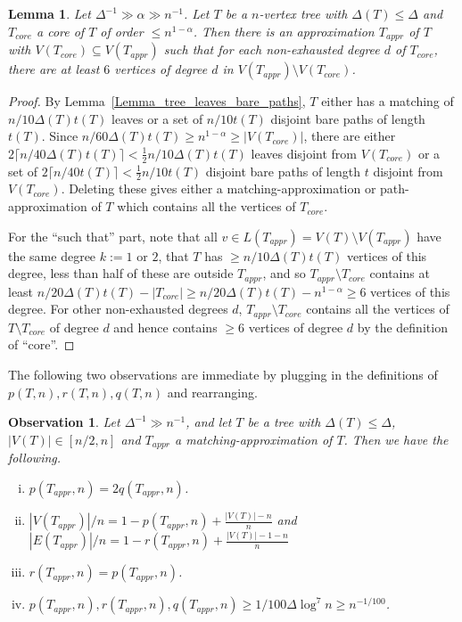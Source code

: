 \documentclass[a4paper,11pt,hidelinks]{amsart}
\newtheorem{lemma}[theorem]{Lemma}
\newtheorem{observation}[theorem]{Observation}
\theoremstyle{definition}
\newcommand{\AM}[1]{\textcolor{blue}{[#1]}}
\begin{document}
\begin{lemma}\label{Lemma_nonexhausted_vertices_in_Tabs}
Let $\Delta^{-1}\gg \alpha\gg n^{-1}$. Let $T$ be a $n$-vertex tree with $\Delta(T)\leq \Delta$ and $T_{core}$ a core of $T$ of order $\leq n^{1-\alpha}$.
Then there is an approximation $T_{appr}$ of $T$ with $V(T_{core})\subseteq V(T_{appr})$ such that for each non-exhausted degree $d$ of $T_{core}$, there are at least $6$ vertices of degree $d$ in $V(T_{appr})\setminus V(T_{core})$. 
\end{lemma}
\begin{proof}
By Lemma~\ref{Lemma_tree_leaves_bare_paths}, $T$ either has a matching   of $n/10\Delta(T)t(T)$ leaves or a set of $n/10t(T)$ disjoint bare paths of length $t(T)$.  Since $n/60\Delta(T)t(T)\geq n^{1-\alpha}\geq |V(T_{core})|$, there are either $2\lceil n/40\Delta(T) t(T)\rceil< \frac 12 n/10\Delta(T)t(T)$ leaves disjoint from $V(T_{core})$ or a set of $2\lceil n/40t(T)\rceil< \frac 12 n/10t(T)$ disjoint bare paths of length $t$ disjoint from $V(T_{core})$.
Deleting these gives either a matching-approximation or path-approximation of $T$ which contains all the vertices of $T_{core}$. 

For the ``such that'' part, note  that all $v\in L(T_{appr})=V(T)\setminus V(T_{appr})$  have the same degree $k:=1$ or $2$, that $T$ has $\geq n/10\Delta(T)t(T)$ vertices of this degree,  less than half of these are outside $T_{appr}$, and so $T_{appr}\setminus T_{core}$ contains at least $n/20\Delta(T)t(T)-|T_{core}|\geq n/20\Delta(T)t(T)-n^{1-\alpha}\geq 6$ vertices of this degree. For other non-exhausted degrees $d$, $T_{appr}\setminus T_{core}$ contains all the vertices of $T\setminus T_{core}$   of degree $d$ and hence contains $\geq 6$ vertices of  degree $d$ by the definition of ``core''.
\end{proof}
 


The following two observations are immediate by plugging in the definitions of $p(T,n), r(T,n), q(T,n)$ and rearranging. 
\begin{observation}\label{Observation_matching-like}
Let $\Delta^{-1}\gg n^{-1}$, and let $T$ be a tree with $\Delta(T)\leq \Delta$, $|V(T)|\in[n/2, n]$ and $T_{appr}$ a matching-approximation of $T$. Then we have the following.
\begin{enumerate}[(i)]
\item $p(T_{appr},n)=2q(T_{appr},n)$.
\item $|V(T_{appr})|/n=1-p(T_{appr},n) +\frac{|V(T)|-n}n$ and $|E(T_{appr})|/n=1-r(T_{appr},n) +\frac{|V(T)|-1-n}n$
\item $r(T_{appr},n)=p(T_{appr},n)$. %
\item $p(T_{appr},n),r(T_{appr},n),q(T_{appr},n)\geq 1/100\Delta\log^7 n\geq n^{-1/100}$.
\end{enumerate}
\end{observation}
\end{document}

